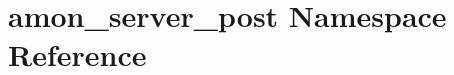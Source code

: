 \hypertarget{namespaceamon__server__post}{\section{amon\-\_\-server\-\_\-post Namespace Reference}
\label{namespaceamon__server__post}
}
